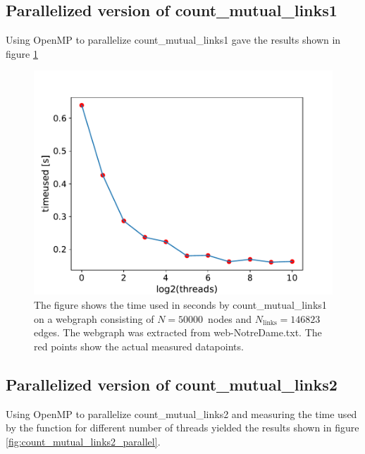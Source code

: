 \documentclass[english,notitlepage, reprint]{revtex4-1}  %
\begin{document}
\subsection*{Parallelized version of count\_mutual\_links1}
Using OpenMP to parallelize count\_mutual\_links1 gave the results shown in figure \ref{fig:count_mutual_links1_parallel}
\begin{figure}[H]
    \centering
    \includegraphics[scale = 0.5]{count_mutual_links1_parallel.pdf}
    \caption{The figure shows the time used  in seconds by count\_mutual\_links1 on a webgraph consisting of $N = 50000$ nodes and $N_\text{links} = 146823$ edges. The webgraph was extracted from web-NotreDame.txt. The red points show the actual measured datapoints.}\label{fig:count_mutual_links1_parallel}
\end{figure}

\subsection*{Parallelized version of count\_mutual\_links2}
Using OpenMP to parallelize count\_mutual\_links2 and measuring the time used by the function for different number of threads yielded the results shown in figure \ref{fig:count_mutual_links2_parallel}.
\end{document}
